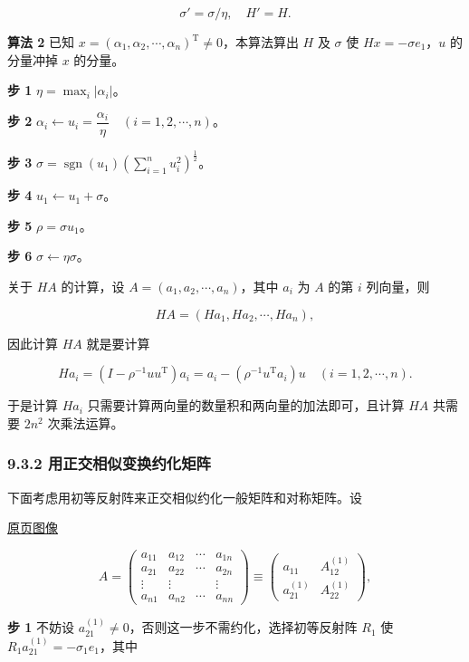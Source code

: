 \documentclass[
  10pt,
  fontset=fandol]{ctexart}
\begin{document}
\[
\sigma'=\sigma/\eta,\quad H'=H.
\]

\textbf{算法 2} 已知 \(x=(\alpha_1,\alpha_2,\cdots,\alpha_n)^{\mathrm T}\ne0\)，本算法算出 \(H\) 及 \(\sigma\) 使 \(Hx=-\sigma e_1\)，\(u\) 的分量冲掉 \(x\) 的分量。

\textbf{步 1} \(\eta=\max_i|\alpha_i|\)。

\textbf{步 2} \(\alpha_i\leftarrow u_i=\dfrac{\alpha_i}{\eta}\quad(i=1,2,\cdots,n)\)。

\textbf{步 3} \(\sigma=\operatorname{sgn}(u_1)\left(\displaystyle\sum_{i=1}^nu_i^2\right)^{\frac12}\)。

\textbf{步 4} \(u_1\leftarrow u_1+\sigma\)。

\textbf{步 5} \(\rho=\sigma u_1\)。

\textbf{步 6} \(\sigma\leftarrow\eta\sigma\)。

关于 \(HA\) 的计算，设 \(A=(a_1,a_2,\cdots,a_n)\)，其中 \(a_i\) 为 \(A\) 的第 \(i\) 列向量，则

\[
HA=(Ha_1,Ha_2,\cdots,Ha_n),
\]

因此计算 \(HA\) 就是要计算

\[
Ha_i=(I-\rho^{-1}uu^{\mathrm T})a_i=a_i-(\rho^{-1}u^{\mathrm T}a_i)u\quad(i=1,2,\cdots,n).
\]

于是计算 \(Ha_i\) 只需要计算两向量的数量积和两向量的加法即可，且计算 \(HA\) 共需要 \(2n^2\) 次乘法运算。

\subsubsection{9.3.2 用正交相似变换约化矩阵}\label{ux7528ux6b63ux4ea4ux76f8ux4f3cux53d8ux6362ux7ea6ux5316ux77e9ux9635}

下面考虑用初等反射阵来正交相似约化一般矩阵和对称矩阵。设

\href{../../source-images/pdf-246.jpeg}{原页图像}

\[
A=\left(\begin{array}{c|ccc}
a_{11}&a_{12}&\cdots&a_{1n}\\\hline
a_{21}&a_{22}&\cdots&a_{2n}\\
\vdots&\vdots&&\vdots\\
a_{n1}&a_{n2}&\cdots&a_{nn}
\end{array}\right)
\equiv\begin{pmatrix}
a_{11}&A_{12}^{(1)}\\
a_{21}^{(1)}&A_{22}^{(1)}
\end{pmatrix},
\]

\textbf{步 1} 不妨设 \(a_{21}^{(1)}\ne0\)，否则这一步不需约化，选择初等反射阵 \(R_1\) 使 \(R_1a_{21}^{(1)}=-\sigma_1e_1\)，其中
\end{document}
